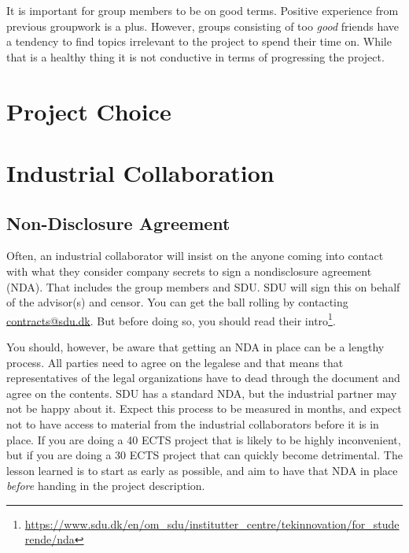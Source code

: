 \documentclass[a4paper, oneside]{memoir}
\newcommand{\idxx}[2]{\index{#1}\marginpar{\raggedright \tiny #2}}
\begin{document}
It is important for group members to be on good terms. Positive experience from previous groupwork is a plus. However, groups consisting of too \textsl{good} friends have a tendency to find topics irrelevant to the project to spend their time on. While that is a healthy thing it is not conductive in terms of progressing the project.

\section{Project Choice}

\section{Industrial Collaboration}




\subsection{Non-Disclosure Agreement}

\idxx{NDA}{NDA} Often, an industrial collaborator will insist on the anyone coming into contact with what they consider company secrets to sign a nondisclosure agreement (NDA). That includes the group members and SDU. SDU will sign this on behalf of the advisor(s) and censor. You can get the ball rolling by contacting \href{mailto:contracts@sdu.dk}{contracts@sdu.dk}. But before doing so, you should read their intro\footnote{\url{https://www.sdu.dk/en/om_sdu/institutter_centre/tekinnovation/for_studerende/nda}}.

You should, however, be aware that getting an NDA in place can be a lengthy process. All parties need to agree on the legalese and that means that representatives of the legal organizations have to dead through the document and agree on the contents. SDU has a standard NDA, but the industrial partner may not be happy about it. Expect this process to be measured in months, and expect not to have access to material from the industrial collaborators before it is in place. If you are doing a 40 ECTS project that is likely to be highly inconvenient, but if you are doing a 30 ECTS project that can quickly become detrimental. The lesson learned is to start as early as possible, and aim to have that NDA in place \textsl{before} handing in the project description.
\end{document}
